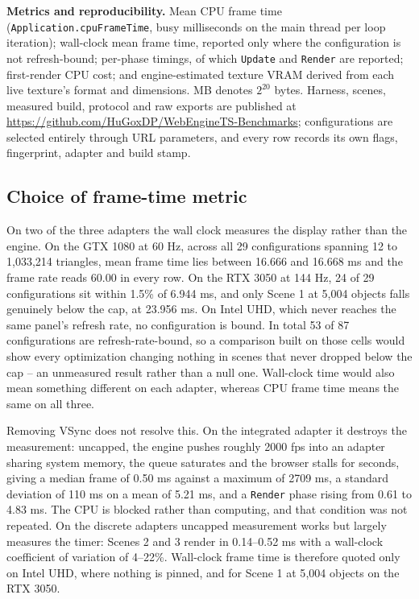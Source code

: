 \textbf{Metrics and reproducibility.} Mean CPU frame time (\texttt{Application.\allowbreak cpuFrameTime}, busy milliseconds on the main thread per loop iteration); wall-clock mean frame time, reported only where the configuration is not refresh-bound; per-phase timings, of which \texttt{Update} and \texttt{Render} are reported; first-render CPU cost; and engine-estimated texture VRAM derived from each live texture's format and dimensions. MB denotes $2^{20}$ bytes. Harness, scenes, measured build, protocol and raw exports are published at \url{https://github.com/HuGoxDP/WebEngineTS-Benchmarks}; configurations are selected entirely through URL parameters, and every row records its own flags, fingerprint, adapter and build stamp.

\subsection{Choice of frame-time metric}
\label{sec:metric}

On two of the three adapters the wall clock measures the display rather than the engine. On the GTX 1080 at 60 Hz, across all 29 configurations spanning 12 to 1{,}033{,}214 triangles, mean frame time lies between 16.666 and 16.668 ms and the frame rate reads 60.00 in every row. On the RTX 3050 at 144 Hz, 24 of 29 configurations sit within 1.5\% of 6.944 ms, and only Scene 1 at 5{,}004 objects falls genuinely below the cap, at 23.956 ms. On Intel UHD, which never reaches the same panel's refresh rate, no configuration is bound. In total 53 of 87 configurations are refresh-rate-bound, so a comparison built on those cells would show every optimization changing nothing in scenes that never dropped below the cap -- an unmeasured result rather than a null one. Wall-clock time would also mean something different on each adapter, whereas CPU frame time means the same on all three.

Removing VSync does not resolve this. On the integrated adapter it destroys the measurement: uncapped, the engine pushes roughly 2000 fps into an adapter sharing system memory, the queue saturates and the browser stalls for seconds, giving a median frame of 0.50 ms against a maximum of 2709 ms, a standard deviation of 110 ms on a mean of 5.21 ms, and a \texttt{Render} phase rising from 0.61 to 4.83 ms. The CPU is blocked rather than computing, and that condition was not repeated. On the discrete adapters uncapped measurement works but largely measures the timer: Scenes 2 and 3 render in 0.14--0.52 ms with a wall-clock coefficient of variation of 4--22\%. Wall-clock frame time is therefore quoted only on Intel UHD, where nothing is pinned, and for Scene 1 at 5{,}004 objects on the RTX 3050.


